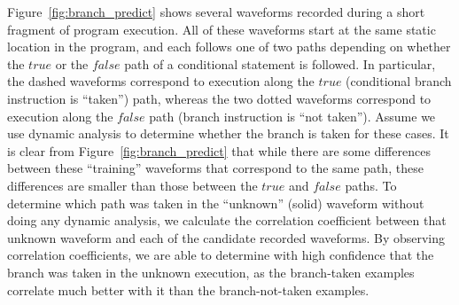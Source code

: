 Figure~\ref{fig:branch_predict} shows several waveforms recorded during a short fragment of program execution. All of these waveforms start at the same static location in the program, and each follows one of two paths depending on whether the $true$ or the $false$ path of a conditional statement is followed. In particular, the dashed waveforms correspond to execution along the $true$ (conditional branch instruction is ``taken'') path, whereas the two dotted waveforms correspond to execution along the $false$ path (branch instruction is ``not taken''). Assume we use dynamic analysis to determine whether the branch is taken for these cases. It is clear from Figure~\ref{fig:branch_predict} that while there are some differences between these ``training'' waveforms that correspond to the same path, these differences are smaller than those between the $true$ and $false$ paths. To determine which path was taken in the ``unknown'' (solid) waveform without doing any dynamic analysis, we calculate the correlation coefficient between that unknown waveform and each of the candidate recorded waveforms. By observing correlation coefficients, we are able to determine with high confidence that the branch was taken in the unknown execution, as the branch-taken examples correlate much better with it than the branch-not-taken examples.

